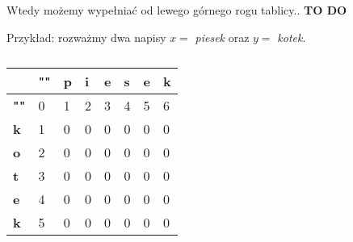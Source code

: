 Wtedy możemy wypełniać od lewego górnego rogu tablicy.. \textbf{TO DO}


Przykład: rozważmy dwa napisy $x =$ \textit{piesek} oraz $y =$ \textit{kotek}.


\begin{table}[H]
	\center
	\begin{tabular}{|l|lllllll|}
		\hline
		& \multicolumn{1}{l|}{\textbf{""}} & \multicolumn{1}{l|}{\textbf{p}} & \multicolumn{1}{l|}{\textbf{i}} & \multicolumn{1}{l|}{\textbf{e}} & \multicolumn{1}{l|}{\textbf{s}} & \multicolumn{1}{l|}{\textbf{e}} & \multicolumn{1}{l|}{\textbf{k}} \\ \hline
		\textbf{""} & 0                                & 1                               & 2                               & 3                               & 4                               & 5                               & 6                               \\ \cline{1-1}
		\textbf{k}  & 1                                & 0                               & 0                               & 0                               & 0                               & 0                               & 0                               \\ \cline{1-1}
		\textbf{o}  & 2                                & 0                               & 0                               & 0                               & 0                               & 0                               & 0                               \\ \cline{1-1}
		\textbf{t}  & 3                                & 0                               & 0                               & 0                               & 0                               & 0                               & 0                               \\ \cline{1-1}
		\textbf{e}  & 4                                & 0                               & 0                               & 0                               & 0                               & 0                               & 0                               \\ \cline{1-1}
		\textbf{k}  & 5                                & 0                               & 0                               & 0                               & 0                               & 0                               & 0                               \\ \cline{1-1}
		\hline
	\end{tabular}
	\caption{}
	\label{tab_zad14}
\end{table}